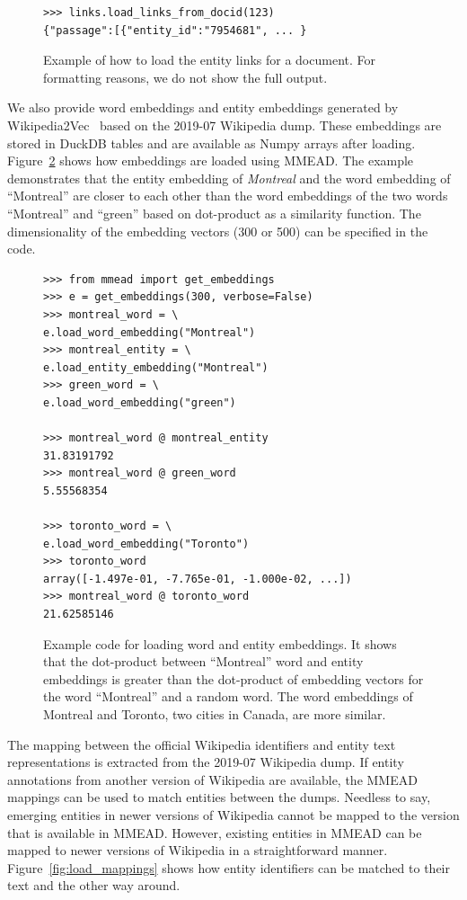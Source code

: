 \begin{figure}
\begin{verbatim}
>>> links.load_links_from_docid(123)
{"passage":[{"entity_id":"7954681", ... }
\end{verbatim}
	\caption{Example of how to load the entity links for a document. For formatting reasons, we do not show the full output. }
	\label{fig:load-links-for-document}
\end{figure}

We also provide word embeddings and entity embeddings generated by Wikipedia2Vec~\citep{wikipedia2vec} based on the 2019-07 Wikipedia dump. These embeddings are stored in DuckDB tables and are available as Numpy arrays after loading. Figure~\ref{fig:dot-product} shows how embeddings are loaded using MMEAD. The example demonstrates that the entity embedding of \emph{Montreal} and the word embedding of ``Montreal'' are closer to each other than the word embeddings of the two words ``Montreal'' and ``green'' based on dot-product as a similarity function. The dimensionality of the embedding vectors (300 or 500) can be specified in the code.

\begin{figure}
	\begin{verbatim}
>>> from mmead import get_embeddings
>>> e = get_embeddings(300, verbose=False)
>>> montreal_word = \
e.load_word_embedding("Montreal")
>>> montreal_entity = \
e.load_entity_embedding("Montreal")
>>> green_word = \
e.load_word_embedding("green")

>>> montreal_word @ montreal_entity
31.83191792
>>> montreal_word @ green_word
5.55568354

>>> toronto_word = \ 
e.load_word_embedding("Toronto")
>>> toronto_word
array([-1.497e-01, -7.765e-01, -1.000e-02, ...])
>>> montreal_word @ toronto_word
21.62585146
	\end{verbatim}
	\caption{Example code for loading word and entity embeddings. It shows that the dot-product between ``Montreal'' word and entity embeddings is greater than the dot-product of embedding vectors for the word ``Montreal'' and a random word. The word embeddings of Montreal and Toronto, two cities in Canada, are more similar.}
	\label{fig:dot-product}
\end{figure}

The mapping between the official Wikipedia identifiers and entity text representations is extracted from the 2019-07 Wikipedia dump. If entity annotations from another version of Wikipedia are available, the MMEAD mappings can be used to match entities between the dumps. 
Needless to say, emerging entities in newer versions of Wikipedia cannot be mapped to the version that is available in MMEAD. However, existing entities in MMEAD can be mapped to newer versions of Wikipedia in a straightforward manner.
Figure~\ref{fig:load_mappings} shows how entity identifiers can be matched to their text and the other way around.  

